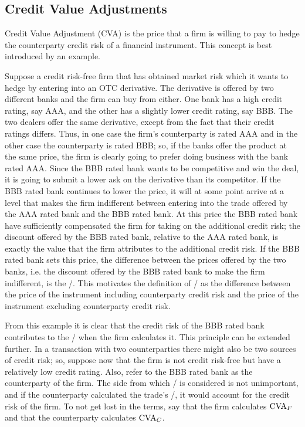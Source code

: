 \documentclass[main.tex]{subfiles}
\begin{document}
    \subsection{Credit Value Adjustments}
        Credit Value Adjustment (CVA) is the price that a firm is willing to pay 
        to hedge the counterparty credit risk of a financial instrument.
        This concept is best introduced by an example. 
        
        Suppose a credit risk-free firm that has obtained market risk 
        which it wants to hedge by entering into an OTC derivative.
        The derivative is offered by two different banks and the firm can buy from either.
        One bank has a high credit rating, say AAA, and the other has a slightly lower credit rating, say BBB. 
        The two dealers offer the same derivative, except from the fact that their credit ratings differs.
        Thus, in one case the firm's counterparty is rated AAA and in the other case the counterparty is rated BBB;
        so, if the banks offer the product at the same price, 
        the firm is clearly going to prefer doing business with the bank rated AAA.
        Since the BBB rated bank wants to be competitive and win the deal,
        it is going to submit a lower ask on the derivative than its competitor.
        If the BBB rated bank continues to lower the price, it will at some point arrive at a level
        that makes the firm indifferent between entering into the trade 
        offered by the AAA rated bank and the BBB rated bank.
        At this price the BBB rated bank have sufficiently compensated the firm for taking on the additional credit risk;
        the discount offered by the BBB rated bank, relative to the AAA rated bank, is exactly the value that the firm
        attributes to the additional credit risk. 
        If the BBB rated bank sets this price, the difference between the prices offered by the two banks,
        i.e. the discount offered by the BBB rated bank to make the firm indifferent, is the \CVA/.
        This motivates the definition of \CVA/ as the difference between the price of the instrument 
        including counterparty credit risk and the price of the instrument excluding counterparty credit risk.

        From this example it is clear that the credit risk of the BBB rated bank contributes to the \CVA/
        when the firm calculates it.
        This principle can be extended further.
        In a transaction with two counterparties there might also be two sources of credit risk;
        so, suppose now that the firm is not credit risk-free but have a relatively low credit rating.
        Also, refer to the BBB rated bank as the counterparty of the firm.
        The side from which \CVA/ is considered is not unimportant,
        and if the counterparty calculated the trade's \CVA/, it would account for the credit risk of the firm.
        To not get lost in the terms, say that the firm calculates $\CVA/_{F}$ 
        and that the counterparty calculates $\CVA/_{C}$.
\end{document}
